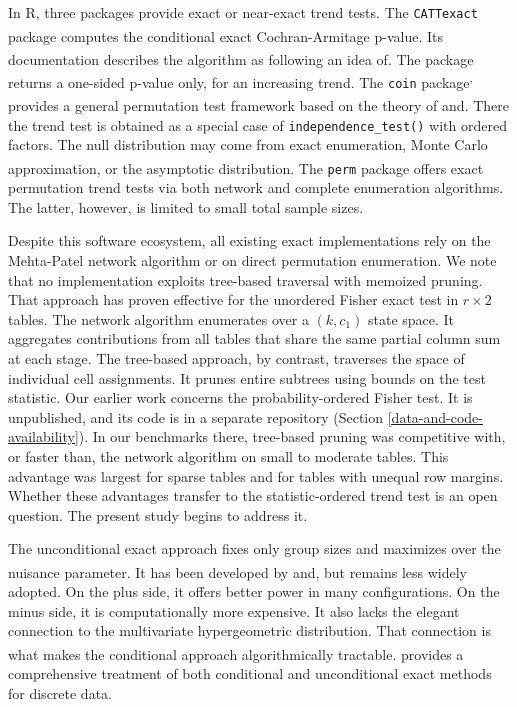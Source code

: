\documentclass[
  11pt,
]{article}
\begin{document}
In R, three packages provide exact or near-exact trend
tests. The \texttt{CATTexact} package\textsuperscript{}
computes the conditional exact Cochran-Armitage p-value.
Its documentation describes the algorithm as following an
idea of\textsuperscript{}. The package returns a one-sided
p-value only, for an increasing trend. The
\texttt{coin} package\textsuperscript{,}
provides a general permutation test framework based on
the theory of\textsuperscript{} and\textsuperscript{}. There the trend test is obtained
as a special case of \texttt{independence\_test()} with ordered
factors. The null distribution may come from exact
enumeration, Monte Carlo approximation, or the asymptotic
distribution. The \texttt{perm}
package\textsuperscript{} offers exact permutation trend
tests via both
network and complete enumeration algorithms. The latter,
however, is limited to small total sample sizes.

Despite this software ecosystem, all existing exact
implementations rely on the Mehta-Patel network
algorithm or on direct permutation enumeration. We note
that no implementation exploits tree-based traversal with
memoized pruning. That approach has proven effective for
the unordered Fisher exact test in \(r \times 2\) tables.
The network algorithm enumerates over a \((k, c_1)\) state
space. It aggregates contributions from all tables that
share the same partial column sum at each stage. The
tree-based approach, by contrast, traverses the space of
individual cell assignments. It prunes entire subtrees
using bounds on the test statistic. Our earlier work
concerns the probability-ordered Fisher test. It is
unpublished, and its code is in a separate repository
(Section \ref{data-and-code-availability}). In our
benchmarks there, tree-based pruning was competitive
with, or faster than, the network algorithm on small to
moderate tables. This advantage was largest for sparse
tables and for tables with unequal row margins. Whether these advantages
transfer to the statistic-ordered trend test is an open
question. The present study begins to address it.

The unconditional exact approach fixes only group sizes
and maximizes over the nuisance parameter. It has been
developed by\textsuperscript{} and\textsuperscript{}, but remains less widely
adopted. On the plus side, it offers better power in many
configurations. On the minus side, it is computationally
more expensive. It also lacks the elegant connection to
the multivariate hypergeometric distribution. That
connection is what makes the conditional approach
algorithmically tractable.\textsuperscript{}
provides a comprehensive treatment of both conditional
and unconditional exact methods for discrete data.
\end{document}
